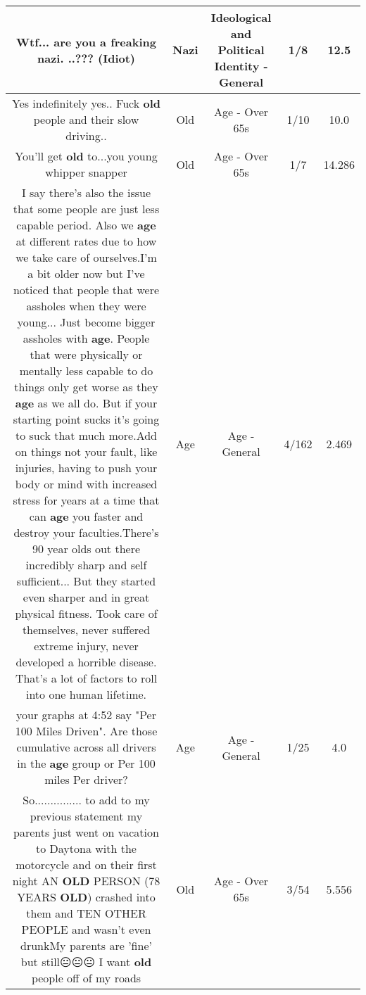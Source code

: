 \documentclass[11pt]{article}
\newlength\mylength
\begin{document}
\begin{center}
\begin{longtable}{|C{.65\mylength}|C{.30\mylength}|C{.12\mylength}|C{.12\mylength}|C{.12\mylength}|}
  \small Wtf... are you a freaking \textbf{nazi}.  ..??? (Idiot)\normalsize   & Nazi &  Ideological and Political Identity - General & 1/8 & 12.5 \\  \hline
  \small Yes indefinitely yes.. Fuck \textbf{old} people and their slow driving..\normalsize   & Old & Age - Over 65s & 1/10 & 10.0 \\  \hline
  \small You'll get \textbf{old} to...you young whipper snapper\normalsize   & Old & Age - Over 65s & 1/7 & 14.286 \\  \hline
  \small I say there's also the issue that some people are just less capable period. Also we \textbf{age} at different rates due to how we take care of ourselves.I'm a bit older now but I've noticed that people that were assholes when they were young... Just become bigger assholes  with \textbf{age}. People that were physically or mentally less capable to do things only get worse as they \textbf{age} as we all do. But if your starting point sucks it's going to suck that much more.Add on things not your fault, like injuries, having to push your body or mind with increased stress for years at a time that can \textbf{age} you faster and destroy your faculties.There's 90 year olds out there incredibly sharp and self sufficient... But they started even sharper and in great physical fitness. Took care of themselves, never suffered extreme injury, never developed a horrible disease. That's a lot of factors to roll into one human lifetime.\normalsize   & Age & Age - General & 4/162 & 2.469 \\  \hline
  \small your graphs at 4:52 say "Per 100 Miles Driven".  Are those cumulative across all drivers in the \textbf{age} group or Per 100 miles Per driver?\normalsize   & Age & Age - General & 1/25 & 4.0 \\  \hline
  \small So............... to add to my previous statement my parents just went on vacation to Daytona with the motorcycle and on their first night AN \textbf{OLD} PERSON (78 YEARS \textbf{OLD}) crashed into them and TEN OTHER PEOPLE and wasn't even drunkMy parents are 'fine' but still😐😐😐 I want \textbf{old} people off of my roads\normalsize   & Old & Age - Over 65s & 3/54 & 5.556 \\  \hline

\end{longtable}
\end{center}
\end{document}
